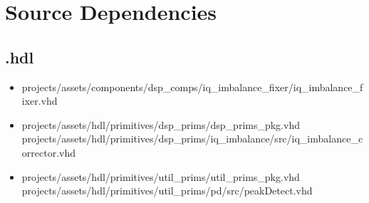 \newpage
\section*{Source Dependencies}
\subsection*{\comp.hdl}
	\begin{itemize}
		\item projects/assets/components/dsp\_comps/iq\_imbalance\_fixer/iq\_imbalance\_fixer.vhd
		\item projects/assets/hdl/primitives/dsp\_prims/dsp\_prims\_pkg.vhd
		      \subitem projects/assets/hdl/primitives/dsp\_prims/iq\_imbalance/src/iq\_imbalance\_corrector.vhd
		\item projects/assets/hdl/primitives/util\_prims/util\_prims\_pkg.vhd
		      \subitem projects/assets/hdl/primitives/util\_prims/pd/src/peakDetect.vhd
	\end{itemize}

